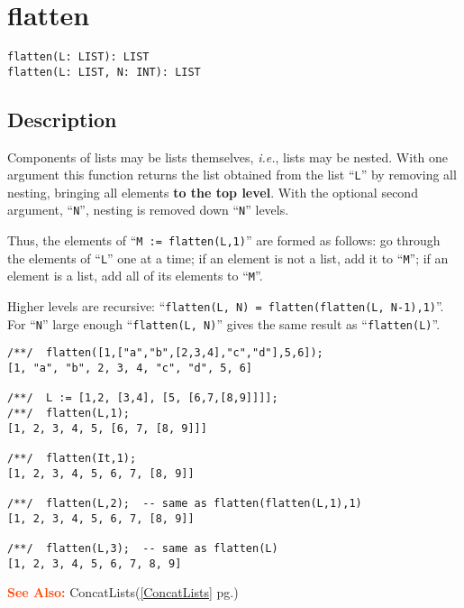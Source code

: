 \documentclass[a4paper]{mybook}
\newenvironment{command}{}{} %
\newcommand\SeeAlso{\par\textcolor{OrangeRed}{\textbf{\large See Also: }}}
\begin{document}
\section{flatten}
\label{flatten}
\begin{command} %


\begin{Verbatim}[label=syntax, rulecolor=\color{MidnightBlue},
frame=single]
flatten(L: LIST): LIST
flatten(L: LIST, N: INT): LIST
\end{Verbatim}


\subsection*{Description}

Components of lists may be lists themselves, \textit{i.e.}, lists may be
nested.  With one argument this function returns the list obtained
from the list ``\verb&L&'' by removing all nesting, bringing all elements \textbf{to
the top level}.  With the optional second argument, ``\verb&N&'', nesting is
removed down ``\verb&N&'' levels.
\par 
Thus, the elements of ``\verb&M := flatten(L,1)&'' are formed as follows:
go through the elements of ``\verb&L&'' one at a time; if an element is
not a list, add it to ``\verb&M&''; if an element is a list, add all of its
elements to ``\verb&M&''.
\par 
Higher levels are recursive: ``\verb&flatten(L, N) = flatten(flatten(L, N-1),1)&''.
For ``\verb&N&'' large enough ``\verb&flatten(L, N)&'' gives the same result as ``\verb&flatten(L)&''.
\begin{Verbatim}[label=example, rulecolor=\color{PineGreen}, frame=single]
/**/  flatten([1,["a","b",[2,3,4],"c","d"],5,6]);
[1, "a", "b", 2, 3, 4, "c", "d", 5, 6]

/**/  L := [1,2, [3,4], [5, [6,7,[8,9]]]];
/**/  flatten(L,1);
[1, 2, 3, 4, 5, [6, 7, [8, 9]]]

/**/  flatten(It,1);
[1, 2, 3, 4, 5, 6, 7, [8, 9]]

/**/  flatten(L,2);  -- same as flatten(flatten(L,1),1)
[1, 2, 3, 4, 5, 6, 7, [8, 9]]

/**/  flatten(L,3);  -- same as flatten(L)
[1, 2, 3, 4, 5, 6, 7, 8, 9]
\end{Verbatim}


\SeeAlso %
  ConcatLists(\ref{ConcatLists} pg.\pageref{ConcatLists})
\end{command} %
\end{document}

